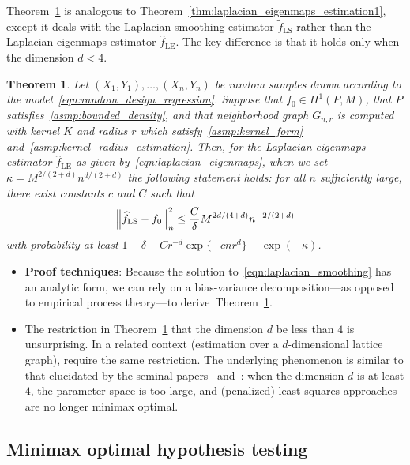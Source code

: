 \documentclass{article}
\newcommand{\1}{\mathbf{1}}
\newcommand{\wt}[1]{\widetilde{#1}}
\newcommand{\wh}[1]{\widehat{#1}}
\newcommand{\LE}{\mathrm{LE}}
\newcommand{\LS}{\mathrm{LS}}
\theoremstyle{alden}
\theoremstyle{aldenthm}
\newtheorem{theorem}{Theorem}
\theoremstyle{definition}
\theoremstyle{remark}
\begin{document}
Theorem~\ref{thm:laplacian_smoothing_estimation1} is analogous to Theorem~\ref{thm:laplacian_eigenmaps_estimation1}, except it deals with the Laplacian smoothing estimator $\wt{f}_{\LS}$ rather than the Laplacian eigenmaps estimator $\wh{f}_{\LE}$. The key difference is that it holds only when the dimension $d < 4$.  
\begin{theorem}
	\label{thm:laplacian_smoothing_estimation1}
	Let $(X_1,Y_1),\ldots,(X_n,Y_n)$ be random samples drawn according to the model~\eqref{eqn:random_design_regression}. Suppose that $f_0 \in H^1(P,M)$, that $P$ satisfies~\ref{asmp:bounded_density}, and that neighborhood graph $G_{n,r}$ is computed with kernel $K$ and radius $r$ which satisfy~\ref{asmp:kernel_form} and~\ref{asmp:kernel_radius_estimation}. Then, for the Laplacian eigenmaps estimator $\wh{f}_{\LE}$ as given by~\eqref{eqn:laplacian_eigenmaps}, when we set $\kappa = M^{2/(2 + d)}n^{d/(2 + d)}$ the following statement holds: for all $n$ sufficiently large, there exist constants $c$ and $C$ such that
	\begin{equation*}
	\Bigl\|\wh{f}_{\LS} - f_0\Bigr\|_n^2 \leq \frac{C}{\delta} M^{2d/(4 + d)} n^{-2/(2 + d)}
	\end{equation*}
	with probability at least $1 - \delta -  Cr^{-d}\exp\{-cnr^d\} - \exp(-\kappa)$.
\end{theorem}

\begin{itemize}
	\item \textbf{Proof techniques}: Because the solution to~\eqref{eqn:laplacian_smoothing} has an analytic form, we can rely on a bias-variance decomposition---as opposed to empirical process theory---to derive~Theorem~\ref{thm:laplacian_smoothing_estimation1}.
	\item The restriction in Theorem~\ref{thm:laplacian_smoothing_estimation1} that the dimension $d$ be less than $4$ is unsurprising. In a related context (estimation over a $d$-dimensional lattice graph), \cite{sadhanala2016} require the same restriction. The underlying phenomenon is similar to that elucidated by the seminal papers~\cite{birge1993} and~\cite{birge1998}: when the dimension $d$ is at least $4$, the parameter space is too large, and (penalized) least squares approaches are no longer minimax optimal.
\end{itemize}

\subsection{Minimax optimal hypothesis testing}
\end{document}
